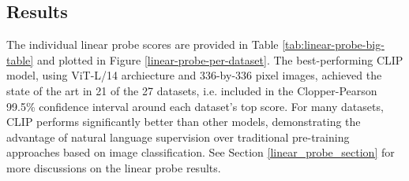 \documentclass{article}
\begin{document}
\subsection{Results}

The individual linear probe scores are provided in Table \ref{tab:linear-probe-big-table} and plotted in Figure \ref{linear-probe-per-dataset}. The best-performing CLIP model, using ViT-L/14 archiecture and 336-by-336 pixel images, achieved the state of the art in 21 of the 27 datasets, i.e. included in the Clopper-Pearson 99.5\% confidence interval around each dataset's top score.
For many datasets, CLIP performs significantly better than other models, demonstrating the advantage of natural language supervision over traditional pre-training approaches based on image classification.
See Section \ref{linear_probe_section} for more discussions on the linear probe results.
\end{document}
